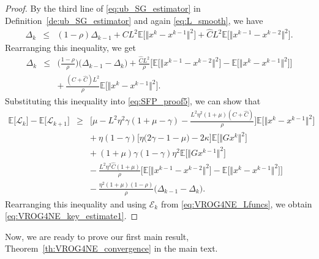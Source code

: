 \documentclass{article}
\newcommand{\norms}[1]{\Vert#1\Vert}
\newcommand{\Expk}[1]{\mathbb{E}\big[#1\big]}
\newcommand{\Lc}{\mathcal{L}}
\newcommand{\Ec}{\mathcal{E}}
\theoremstyle{plain}
\theoremstyle{definition}
\theoremstyle{remark}
\begin{document}
\begin{proof}
By the third line of  \eqref{eq:ub_SG_estimator} in Definition~\ref{de:ub_SG_estimator} and again \eqref{eq:L_smooth}, we have
\begin{equation*} 
\begin{array}{lcl}
\Delta_{k} & \leq &  (1 - \rho ) \Delta_{k-1}   + C L^2 \Expk{ \norms{x^{k} - x^{k-1}}^2 }  +  \hat{C} L^2  \Expk{ \norms{x^{k-1} - x^{k-2}}^2 }.
\end{array}
\end{equation*}
Rearranging this inequality, we get
\begin{equation*} 
\begin{array}{lcl}
\Delta_{k} & \leq &   \big( \frac{1-\rho}{\rho} \big) \big( \Delta_{k-1} - \Delta_{k} \big)  + \frac{\hat{C} L^2}{ \rho } \big[ \Expk{ \norms{x^{k-1} - x^{k-2}}^2  } -  \Expk{ \norms{x^k - x^{k-1}}^2 } \big] \\
&& + {~}  \frac{(C + \hat{C})L^2}{ \rho }  \Expk{ \norms{x^{k} - x^{k-1}}^2 }.
\end{array}
\end{equation*}
Substituting this inequality into \eqref{eq:SFP_proof5}, we can show that
\begin{equation*} 
\begin{array}{lcl}
\Expk{ \Lc_k } - \Expk{ \Lc_{k+1} } & \geq &  \Big[ \mu -   L^2\eta^2\gamma(1 + \mu - \gamma) - \frac{L^2\eta^2(1+\mu)(C + \hat{C})}{ \rho } \Big] \Expk{ \norms{x^k - x^{k-1}}^2 } \\
&& + {~}  \eta (1-\gamma) \big[ \eta \big( 2\gamma - 1 - \mu \big) - 2 \kappa \big]  \Expk{ \norms{Gx^k}^2 }  \\
&& + {~} (1+\mu)\gamma(1-\gamma)\eta^2 \Expk{ \norms{Gx^{k-1}}^2 }  \\
&& - {~} \frac{L^2\eta^2\hat{C}(1+\mu)}{ \rho } \big[ \Expk{ \norms{x^{k-1} - x^{k-2}}^2 }  - \Expk{ \norms{x^k - x^{k-1}}^2 } \big] \\
&& - {~} \frac{\eta^2(1+\mu)(1-\rho)}{\rho} \big( \Delta_{k-1} - \Delta_{k} \big).
\end{array}
\end{equation*}
Rearranging this inequality and using $\Ec_k$ from \eqref{eq:VROG4NE_Lfuncs}, we obtain \eqref{eq:VROG4NE_key_estimate1}.
\end{proof}

Now, we are ready to prove our first main result, Theorem~\ref{th:VROG4NE_convergence} in the main text.
\end{document}
